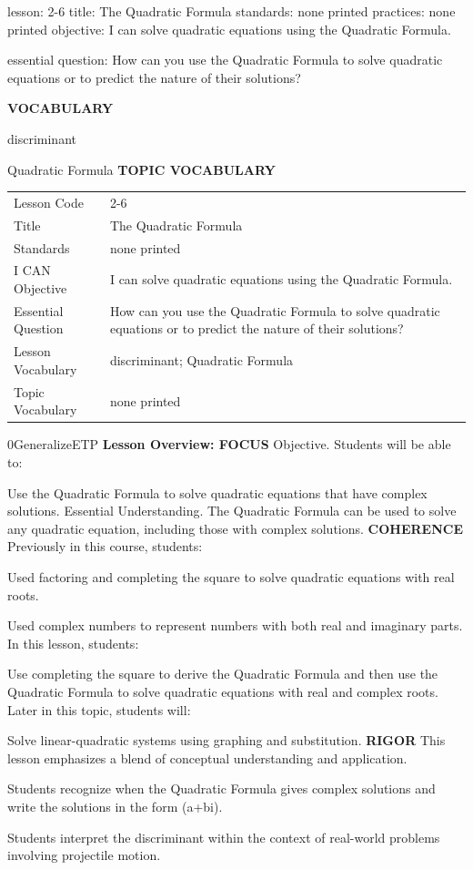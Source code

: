 \documentclass{article}
\newenvironment{lesson-meta}{}{}        %
\newenvironment{te-addendum}[2]{}{}     %
\newcommand{\te}[1]{}                   %
\begin{document}
\begin{lesson-meta}
lesson: 2-6
title: The Quadratic Formula
standards: none printed
practices: none printed
objective: I can solve quadratic equations using the Quadratic Formula.

essential question: How can you use the Quadratic Formula to solve quadratic equations or to predict the nature of their solutions?

\textbf{VOCABULARY}
\item discriminant
\item Quadratic Formula
\textbf{TOPIC VOCABULARY}
\te{No topic vocabulary list is printed on these pages.}
\begin{tabular}{ll}
Lesson Code & 2-6 \\
Title & The Quadratic Formula \\
Standards & none printed \\
I CAN Objective & I can solve quadratic equations using the Quadratic Formula. \\
Essential Question & How can you use the Quadratic Formula to solve quadratic equations or to predict the nature of their solutions? \\
Lesson Vocabulary & discriminant; Quadratic Formula \\
Topic Vocabulary & none printed \\
\end{tabular}
\end{lesson-meta}
\begin{te-addendum}{0}{GeneralizeETP}
\textbf{Lesson Overview: FOCUS}
Objective. Students will be able to:
\item Use the Quadratic Formula to solve quadratic equations that have complex solutions.
Essential Understanding. The Quadratic Formula can be used to solve any quadratic equation, including those with complex solutions.
\textbf{COHERENCE}
Previously in this course, students:
\item Used factoring and completing the square to solve quadratic equations with real roots.
\item Used complex numbers to represent numbers with both real and imaginary parts.
In this lesson, students:
\item Use completing the square to derive the Quadratic Formula and then use the Quadratic Formula to solve quadratic equations with real and complex roots.
Later in this topic, students will:
\item Solve linear-quadratic systems using graphing and substitution.
\textbf{RIGOR}
This lesson emphasizes a blend of conceptual understanding and application.
\item Students recognize when the Quadratic Formula gives complex solutions and write the solutions in the form (a+bi).
\item Students interpret the discriminant within the context of real-world problems involving projectile motion.
\end{te-addendum}
\end{document}
